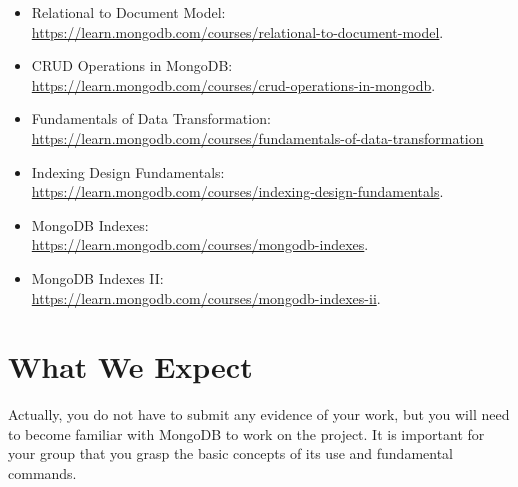 \documentclass{article}
\begin{document}
\begin{itemize}
    \item Relational to Document Model:\\ \url{https://learn.mongodb.com/courses/relational-to-document-model}.
    \item CRUD Operations in MongoDB:\\ \url{https://learn.mongodb.com/courses/crud-operations-in-mongodb}.
    \item Fundamentals of Data Transformation:\\ \url{https://learn.mongodb.com/courses/fundamentals-of-data-transformation}
    \item Indexing Design Fundamentals:\\ \url{https://learn.mongodb.com/courses/indexing-design-fundamentals}.
    \item MongoDB Indexes:\\ \url{https://learn.mongodb.com/courses/mongodb-indexes}.
    \item MongoDB Indexes II:\\ \url{https://learn.mongodb.com/courses/mongodb-indexes-ii}.
\end{itemize}




\section{What We Expect}
Actually, you do not have to submit any evidence of your work, but you will need to become familiar with MongoDB to work on the project. It is important for your group that you grasp the basic concepts of its use and fundamental commands.

\end{document}
